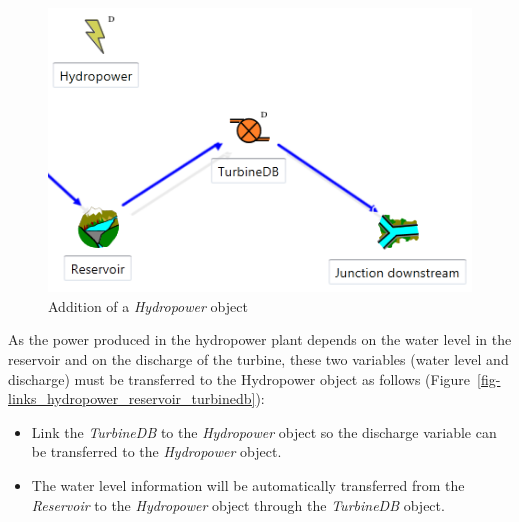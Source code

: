 \documentclass[
  letterpaper,
  DIV=11,
  numbers=noendperiod]{scrreprt}
\begin{document}
\begin{figure}

{\centering \includegraphics{./figures/fig-addition_hydropower.png}

}

\caption{\label{fig-addition_hydropower}Addition of a \emph{Hydropower}
object}

\end{figure}

As the power produced in the hydropower plant depends on the water level
in the reservoir and on the discharge of the turbine, these two
variables (water level and discharge) must be transferred to the
Hydropower object as follows
(Figure~\ref{fig-links_hydropower_reservoir_turbinedb}):

\begin{itemize}
\item
  {Link the \emph{TurbineDB} to the \emph{Hydropower} object so the
  discharge variable can be transferred to the \emph{Hydropower}
  object.}
\item
  {The water level information will be automatically transferred from
  the \emph{Reservoir} to the \emph{Hydropower} object through the
  \emph{TurbineDB} object.}
\end{itemize}
\end{document}
